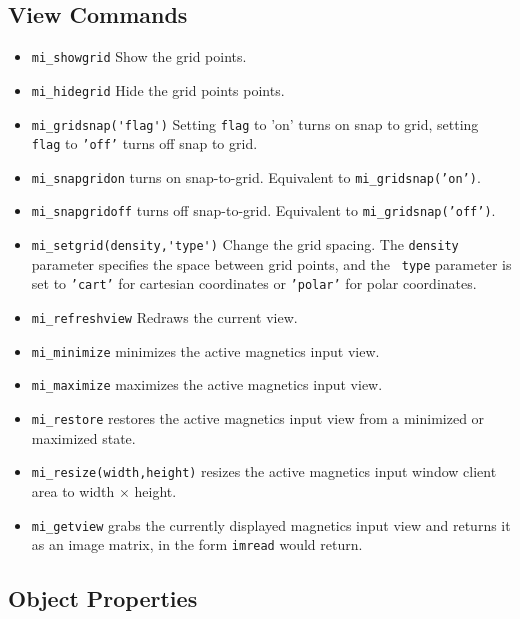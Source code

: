 \subsection{View Commands}

\begin{itemize}
\item{\verb+mi_showgrid+} Show the grid points.
\item{\verb+mi_hidegrid+} Hide the grid points points.
\item{\verb+mi_gridsnap('flag')+}
Setting {\tt flag} to 'on' turns on snap to grid, setting {\tt
flag} to {\tt 'off'} turns off snap to grid.
\item{\tt mi\_snapgridon} turns on snap-to-grid. Equivalent to {\tt mi\_gridsnap('on')}.

\item{\tt mi\_snapgridoff} turns off snap-to-grid. Equivalent to {\tt mi\_gridsnap('off')}.

\item{\verb+mi_setgrid(density,'type')+} Change the grid spacing.  The {\tt density}
parameter specifies the space between grid points, and the {\tt
type} parameter is set to {\tt 'cart'} for cartesian coordinates or
{\tt 'polar'} for polar coordinates.
\item{\tt mi\_refreshview} Redraws the current view.
\item{\tt mi\_minimize} minimizes the active magnetics input view.
\item{\tt mi\_maximize} maximizes the active magnetics input view.
\item{\tt mi\_restore} restores the active magnetics input view from a
 minimized or maximized state.
\item{\tt mi\_resize(width,height)} resizes the active magnetics input
 window client area to width $\times$ height.
\item{\tt mi\_getview} grabs the currently displayed magnetics input view and
 returns it as an image matrix, in the form \texttt{imread} would return.
\end{itemize}

\subsection{Object Properties}


